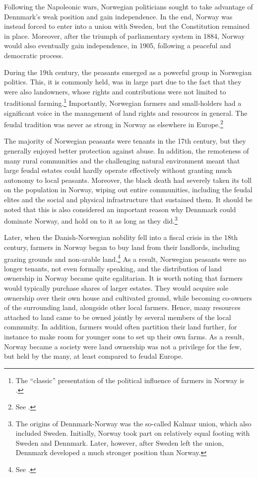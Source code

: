 Following the Napoleonic wars, Norwegian politicians sought to take advantage of Dennmark's weak position and gain independence. In the end, Norway was instead forced to enter into a union with Sweden, but the Constitution remained in place. Moreover, after the triumph of parliamentary system in 1884, Norway would also eventually gain independence, in 1905, following a  peaceful and democratic process.

During the 19th century, the peasants emerged as a powerful group in Norwegian politics. This, it is commonly held, was in large part due to the fact that they were also landowners, whose rights and contributions were not limited to traditional farming.\footnote{The ``classic'' presentation of the political influence of farmers in Norway is \cite{koht26}.} Importantly, Norwegian farmers and small-holders had a significant voice in the management of land rights and resources in general. The feudal tradition was never as strong in Norway as elsewhere in Europe.\footnote{See \cite[59-60]{pryser99}.}

The majority of Norwegian peasants were tenants in the 17th century, but they generally enjoyed better protection against abuse. In addition, the remoteness of many rural communities and the challenging natural environment meant that large feudal estates could hardly operate effectively without granting much autonomy to local peasants. Moreover, the black death had severely taken its toll on the population in Norway, wiping out entire communities, including the feudal elites and the social and physical infrastructure that sustained them. It should be noted that this is also considered an important reason why Dennmark could dominate Norway, and hold on to it as long as they did.\footnote{The origins of Dennmark-Norway was the so-called Kalmar union, which also included Sweden. Initially, Norway took part on relatively equal footing with Sweden and Dennmark. Later, however, after Sweden left the union, Dennmark developed a much stronger position than Norway.}

Later, when the Danish-Norwegian nobility fell into a fiscal crisis in the 18th century, farmers in Norway began to buy land from their landlords, including grazing grounds and non-arable land.\footnote{See \cite[59-60]{pryser99}.} As a result, Norwegian peasants were no longer tenants, not even formally speaking, and the distribution of land ownership in Norway became quite egalitarian. It is worth noting that farmers would typically purchase shares of larger estates. They would acquire sole ownership over their own house and cultivated ground, while becoming co-owners of the surrounding land, alongside other local farmers. Hence, many resources attached to land came to be owned jointly by several members of the local community. In addition, farmers would often partition their land further, for instance to make room for younger sons to set up their own farms. As a result, Norway became a society were land ownership was not a privilege for the few, but held by the many, at least compared to feudal Europe.

